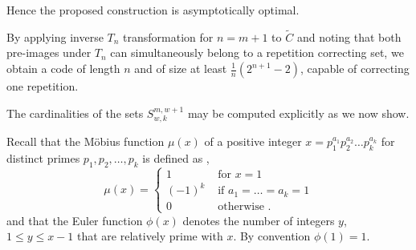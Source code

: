 \documentclass[12pt]{article} \pagestyle{plain} \topmargin
\begin{document}
Hence the proposed construction is asymptotically optimal.

By applying inverse $T_n$ transformation for $n=m+1$ to $\tilde{C}$
and noting that both pre-images under $T_n$ can simultaneously
belong to a repetition correcting set, we obtain a code of length
$n$ and of size at least $\frac{1}{n}
                           \left(2^{n+1}-2\right)$, capable of
                           correcting one repetition.



The cardinalities of the sets $S_{w,k}^{m,w+1}$ may be computed
explicitly as we now show.

Recall that the M\"{o}bius function $\mu(x)$ of a positive integer
$x=p_1^{a_1}p_2^{a_2}\dots p_k^{a_k}$ for distinct primes
$p_1,p_2,\dots,p_k$ is defined as \cite{apostol},
\begin{equation}
\mu(x)=\left\{ \begin{array}{lll} 1 &\text{ for }x=1\\
(-1)^k &\text{ if }a_1=\dots=a_k=1\\
0 &\text{ otherwise }.
\end{array}\right.
\end{equation}and that the Euler function $\phi(x)$ denotes the number of
integers $y$, $1 \leq y \leq x-1$ that are relatively prime with
$x$. By convention $\phi(1)=1$.
\end{document}
